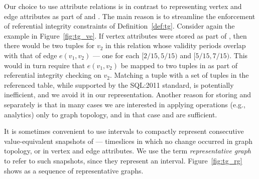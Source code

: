 
Our choice to use attribute relations is in contrast to representing
vertex and edge attributes as part of \tv and \te.  The main reason is
to streamline the enforcement of referential integrity constraints of
Definition~\ref{def:tg}.  Consider again the example in
Figure~\ref{fig:tg_ve}.  If vertex attributes were stored as part of
\tv, then there would be two tuples for $v_2$ in this relation whose
validity periods overlap with that of edge $e(v_1, v_2)$ --- one for
each $[2/15, 5/15)$ and $[5/15, 7/15)$.  This would in turn require
    that $e(v_1, v_2)$ be mapped to two tuples in \tv as part of
    referential integrity checking on $v_2$.  Matching a tuple with a
    set of tuples in the referenced table, while supported by the
    SQL:2011 standard, is potentially inefficient, and we avoid it in
    our representation.
%
Another reason for storing \tav and \tae separately is that in many
cases we are interested in applying operations (e.g., analytics) only
to graph topology, and in that case \tv and \te are sufficient.
%

It is sometimes convenient to use intervals to compactly represent
consecutive value-equivalent snapshots of \tve --- timeslices in which
no change occurred in graph topology, or in vertex and edge
attributes.  We use the term {\em representative graph} to refer to
such snapshots, since they represent an interval.
Figure~\ref{fig:tg_rg} shows  as a sequence of
representative graphs.




